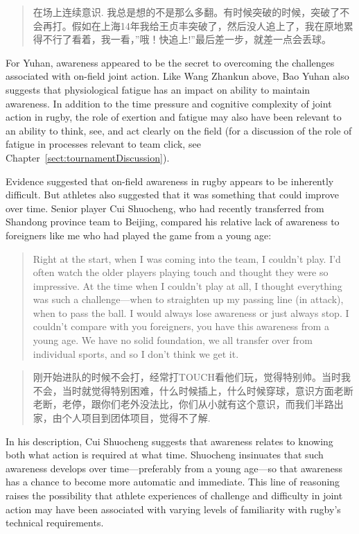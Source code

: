 \begin{CJK}{UTF8}{gbsn}
    \begin{quote}
    在场上连续意识. 我总是想的不是那么多翻。有时候突破的时候，突破了不会再打。假如在上海14年我给王贞丰突破了，然后没人追上了，我在原地累得不行了看着，我一看，''哦！快追上!''最后差一步，就差一点会丢球。
    \end{quote}

For Yuhan, awareness appeared to be the secret to overcoming the challenges associated with on-field joint action.  Like Wang Zhankun above, Bao Yuhan also suggests that physiological fatigue has an impact on ability to maintain awareness. In addition to the time pressure and cognitive complexity of joint action in rugby, the role of exertion and fatigue may also have been relevant to an ability to think, see, and act clearly on the field (for a discussion of the role of fatigue in processes relevant to team click, see Chapter~\ref{sect:tournamentDiscussion}).

Evidence suggested that on-field awareness in rugby appears to be inherently difficult.  But athletes also suggested that it was something that could improve over time.  Senior player Cui Shuocheng, who had recently transferred from Shandong province team to Beijing, compared his relative lack of awareness to foreigners like me who had played the game from a young age:

      \begin{quote}
      Right at the start, when I was coming into the team, I couldn't play. I'd often watch the older players playing touch and thought they were so impressive.  At the time when I couldn't play at all, I thought everything was such a challenge---when to straighten up my passing line (in attack), when to pass the ball.  I would always lose awareness or just always stop. I couldn't compare with you foreigners, you have this awareness from a young age.  We have no solid foundation, we all transfer over from individual sports, and so I don't think we get it.
      \end{quote}

      \begin{quote}
      刚开始进队的时候不会打，经常打TOUCH看他们玩，觉得特别帅。当时我不会，当时就觉得特别困难，什么时候插上，什么时候穿球，意识方面老断老断，老停，跟你们老外没法比，你们从小就有这个意识，而我们半路出家，由个人项目到团体项目，觉得不了解.
      \end{quote}
In his description, Cui Shuocheng suggests that awareness relates to knowing both what action is required at what time. Shuocheng insinuates that such awareness develops over time---preferably from a young age---so that awareness has a chance to become more automatic and immediate.  This line of reasoning raises the possibility that athlete experiences of challenge and difficulty in joint action may have been associated with varying levels of familiarity with rugby's technical requirements.








\end{CJK}
